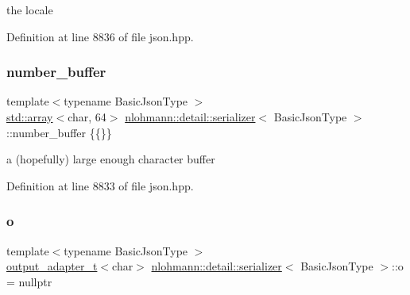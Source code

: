 the locale 



Definition at line 8836 of file json.\+hpp.

\mbox{\label{classnlohmann_1_1detail_1_1serializer_a1a9d8b344a6cb47728a3519693ec03d1}} 
\subsubsection{\texorpdfstring{number\+\_\+buffer}{number\_buffer}}
{\footnotesize\ttfamily template$<$typename Basic\+Json\+Type $>$ \\
\hyperlink{namespacenlohmann_1_1detail_a1ed8fc6239da25abcaf681d30ace4985af1f713c9e000f5d3f280adbd124df4f5}{std\+::array}$<$char, 64$>$ \hyperlink{classnlohmann_1_1detail_1_1serializer}{nlohmann\+::detail\+::serializer}$<$ Basic\+Json\+Type $>$\+::number\+\_\+buffer \{\{\}\}\hspace{0.3cm}{\ttfamily [private]}}



a (hopefully) large enough character buffer 



Definition at line 8833 of file json.\+hpp.

\mbox{\label{classnlohmann_1_1detail_1_1serializer_acf3c88660d3cbc65fc71c4d84f2a9f59}} 
\subsubsection{\texorpdfstring{o}{o}}
{\footnotesize\ttfamily template$<$typename Basic\+Json\+Type $>$ \\
\hyperlink{namespacenlohmann_1_1detail_a9b680ddfb58f27eb53a67229447fc556}{output\+\_\+adapter\+\_\+t}$<$char$>$ \hyperlink{classnlohmann_1_1detail_1_1serializer}{nlohmann\+::detail\+::serializer}$<$ Basic\+Json\+Type $>$\+::o = nullptr\hspace{0.3cm}{\ttfamily [private]}}



